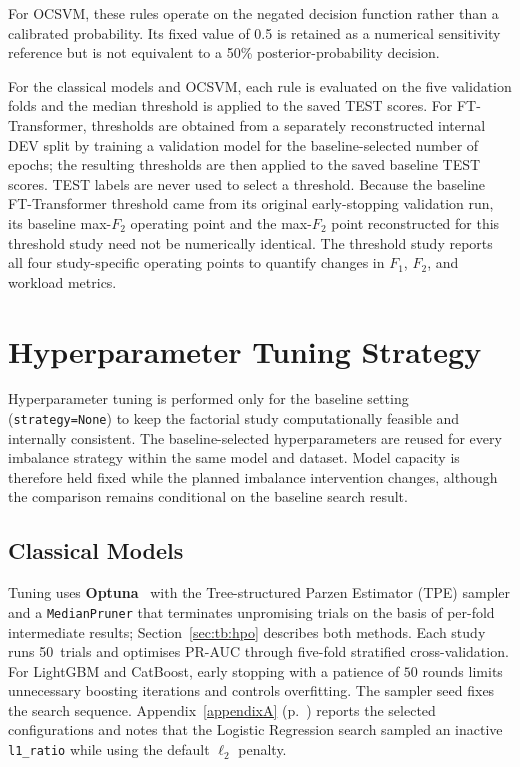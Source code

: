 For OCSVM, these rules operate on the negated decision function rather than a calibrated probability. Its fixed value of 0.5 is retained as a numerical sensitivity reference but is not equivalent to a 50\% posterior-probability decision.

For the classical models and OCSVM, each rule is evaluated on the five validation folds and the median threshold is applied to the saved TEST scores. For FT-Transformer, thresholds are obtained from a separately reconstructed internal DEV split by training a validation model for the baseline-selected number of epochs; the resulting thresholds are then applied to the saved baseline TEST scores. TEST labels are never used to select a threshold. Because the baseline FT-Transformer threshold came from its original early-stopping validation run, its baseline max-$F_2$ operating point and the max-$F_2$ point reconstructed for this threshold study need not be numerically identical. The threshold study reports all four study-specific operating points to quantify changes in $F_1$, $F_2$, and workload metrics.

\section{Hyperparameter Tuning Strategy}
\label{sec:tuning}

Hyperparameter tuning is performed only for the baseline setting (\texttt{strategy=None}) to keep the factorial study computationally feasible and internally consistent. The baseline-selected hyperparameters are reused for every imbalance strategy within the same model and dataset. Model capacity is therefore held fixed while the planned imbalance intervention changes, although the comparison remains conditional on the baseline search result.

\subsection{Classical Models}

Tuning uses \textbf{Optuna}~\cite{akiba2019optuna} with the Tree-structured Parzen Estimator (TPE) sampler and a \texttt{MedianPruner} that terminates unpromising trials on the basis of per-fold intermediate results; Section~\ref{sec:tb:hpo} describes both methods. Each study runs 50~trials and optimises PR-AUC through five-fold stratified cross-validation. For LightGBM and CatBoost, early stopping with a patience of $50$ rounds limits unnecessary boosting iterations and controls overfitting. The sampler seed fixes the search sequence. Appendix~\ref{appendixA} (p.~\pageref{appendixA}) reports the selected configurations and notes that the Logistic Regression search sampled an inactive \texttt{l1\_ratio} while using the default $\ell_2$ penalty.

